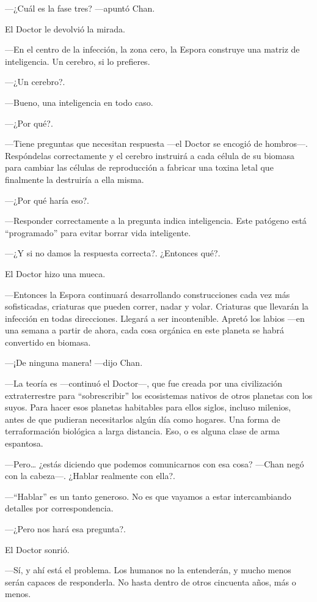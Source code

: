 ---¿Cuál es la fase tres? ---apuntó Chan.

El Doctor le devolvió la mirada.

---En el centro de la infección, la zona cero, la Espora construye una
matriz de inteligencia. Un cerebro, si lo prefieres.

---¿Un cerebro?.

---Bueno, una inteligencia en todo caso.

---¿Por qué?.

---Tiene preguntas que necesitan respuesta ---el Doctor se encogió de
hombros---. Respóndelas correctamente y el cerebro instruirá a cada
célula de su biomasa para cambiar las células de reproducción a fabricar
una toxina letal que finalmente la destruiría a ella misma.

---¿Por qué haría eso?.

---Responder correctamente a la pregunta indica inteligencia. Este
patógeno está ``programado'' para evitar borrar vida inteligente.

---¿Y si no damos la respuesta correcta?. ¿Entonces qué?.

El Doctor hizo una mueca.

---Entonces la Espora continuará desarrollando construcciones cada vez
más sofisticadas, criaturas que pueden correr, nadar y volar. Criaturas
que llevarán la infección en todas direcciones. Llegará a ser
incontenible. Apretó los labios ---en una semana a partir de ahora, cada
cosa orgánica en este planeta se habrá convertido en biomasa.

---¡De ninguna manera! ---dijo Chan.

---La teoría es ---continuó el Doctor---, que fue creada por una
civilización extraterrestre para ``sobrescribir'' los ecosistemas
nativos de otros planetas con los suyos. Para hacer esos planetas
habitables para ellos siglos, incluso milenios, antes de que pudieran
necesitarlos algún día como hogares. Una forma de terraformación
biológica a larga distancia. Eso, o es alguna clase de arma espantosa.

---Pero\ldots{} ¿estás diciendo que podemos comunicarnos con esa cosa?
---Chan negó con la cabeza---. ¿Hablar realmente con ella?.

---``Hablar'' es un tanto generoso. No es que vayamos a estar
intercambiando detalles por correspondencia.

---¿Pero nos hará esa pregunta?.

El Doctor sonrió.

---Sí, y ahí está el problema. Los humanos no la entenderán, y mucho
menos serán capaces de responderla. No hasta dentro de otros cincuenta
años, más o menos.

